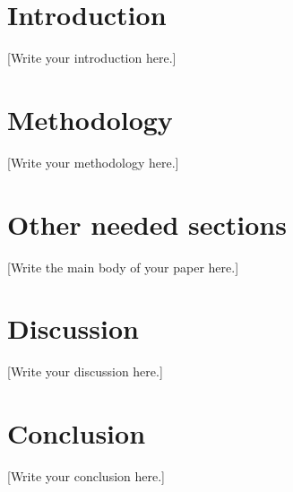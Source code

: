 \section{Introduction}

[Write your introduction here.]

\section{Methodology}
\label{sec:methodology}

[Write your methodology here.]

\section{Other needed sections}
\label{sec:thematic-overview}

[Write the main body of your paper here.]

\section{Discussion}
\label{sec:discussion}

[Write your discussion here.]

\section{Conclusion}
\label{sec:Conclusion}

[Write your conclusion here.]


